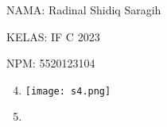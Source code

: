 \documentclass[10pt,a4paper]{article}
\date{}
\newcommand{\lstinputwithcaption}[2]{%
}
\begin{document}
NAMA: Radinal Shidiq Saragih

KELAS: IF C 2023

NPM: 5520123104

\begin{enumerate}

%
%
%
%
%
%
%
%
%
%
%
%
%
%
%
%
%
%
%
%
%
%
%
  \setcounter{enumi}{3}

  \item 

    \begin{multicols}{2}

      \begin{center}

        \lstinputwithcaption{./code/src/soal4/Kasir.java}{Kasir.java}

        \columnbreak
        \lstinputwithcaption{./code/src/soal4/Main.java}{Main.java}

        \texttt{[image: s4.png]}

      \end{center}

    \end{multicols}

  \item 



\end{enumerate}
\end{document}
